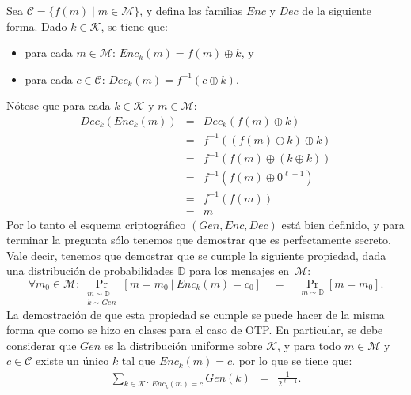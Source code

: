 \documentclass[11pt]{article}
\newcommand{\Enc}{\textit{Enc}}
\newcommand{\Dec}{\textit{Dec}}
\newcommand{\Gen}{\textit{Gen}}
\newcommand{\M}{\mathcal{M}}
\newcommand{\C}{\mathcal{C}}
\newcommand{\K}{\mathcal{K}}
\begin{document}
Sea $\C = \{ f(m) \mid m \in \M\}$, y defina las familias $\Enc$ y
$\Dec$ de la siguiente forma. Dado $k \in \K$, se tiene que:
\begin{itemize}
  \item para cada $m \in \M$: $\Enc_k(m) = f(m) \oplus k$, y 
  \item para cada $c \in \C$: $\Dec_k(m) = f^{-1}(c \oplus k)$.
\end{itemize}
Nótese que para cada $k \in \K$ y $m \in \M$:
\begin{eqnarray*}
  \Dec_k(\Enc_k(m)) &=& \Dec_k(f(m) \oplus k)\\
  &=& f^{-1}((f(m) \oplus k) \oplus k)\\
  &=& f^{-1}(f(m) \oplus (k \oplus k))\\
  &=& f^{-1}(f(m) \oplus 0^{\ell + 1})\\
  &=& f^{-1}(f(m))\\
  &=& m
\end{eqnarray*}
Por lo tanto el esquema criptográfico $(\Gen, \Enc, \Dec)$ está bien
definido, y para terminar la pregunta sólo tenemos que demostrar que
es perfectamente secreto. Vale decir, tenemos que demostrar que se
cumple la siguiente propiedad, dada una distribución de probabilidades
$\mathbb{D}$ para los mensajes en~$\M$:
$$
\forall m_0\in\mathcal{M}:\underset{
	\begin{array}{cc}
    	m\sim\mathbb{D}\\
    	k\sim\textit{Gen}
    \end{array}
}
{\Pr}[m=m_0\ |\ \textit{Enc}_k(m)=c_0]\quad = \quad 
\underset{m\sim \mathbb{D}}
{\Pr}[m=m_0].
$$
La demostración de que esta propiedad se cumple se puede hacer de
la misma forma que como se hizo en clases para el caso de OTP. En particular, se debe
considerar que $\Gen$ es la distribución uniforme sobre $\K$, y para
todo $m \in \M$ y $c \in \C$ existe un único $k$ tal que $\Enc_k(m) =
c$, por lo que se tiene que:
\begin{eqnarray*}
  \sum_{k\in\mathcal{K}\,:\,\Enc_k(m)=c} \Gen(k) &=& \frac{1}{2^{\ell+1}}.
\end{eqnarray*}


  
\end{document}
